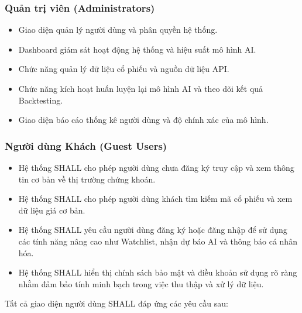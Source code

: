 \documentclass[12pt, a4paper]{article}
\begin{document}
\subsubsection{Quản trị viên (Administrators)}
\begin{itemize}
    \item Giao diện quản lý người dùng và phân quyền hệ thống.

    \item Dashboard giám sát hoạt động hệ thống và hiệu suất mô hình AI.

    \item Chức năng quản lý dữ liệu cổ phiếu và nguồn dữ liệu API.

    \item Chức năng kích hoạt huấn luyện lại mô hình AI và theo dõi kết quả Backtesting.

    \item Giao diện báo cáo thống kê người dùng và độ chính xác của mô hình.
\end{itemize}


\subsubsection{Người dùng Khách (Guest Users)}
\begin{itemize}
    \item Hệ thống SHALL cho phép người dùng chưa đăng ký truy cập và xem thông tin cơ bản về thị trường chứng khoán.

    \item Hệ thống SHALL cho phép người dùng khách tìm kiếm mã cổ phiếu và xem dữ liệu giá cơ bản.

    \item Hệ thống SHALL yêu cầu người dùng đăng ký hoặc đăng nhập để sử dụng các tính năng nâng cao như Watchlist, nhận dự báo AI và thông báo cá nhân hóa.

    \item Hệ thống SHALL hiển thị chính sách bảo mật và điều khoản sử dụng rõ ràng nhằm đảm bảo tính minh bạch trong việc thu thập và xử lý dữ liệu.
\end{itemize}


Tất cả giao diện người dùng SHALL đáp ứng các yêu cầu sau:
\end{document}
